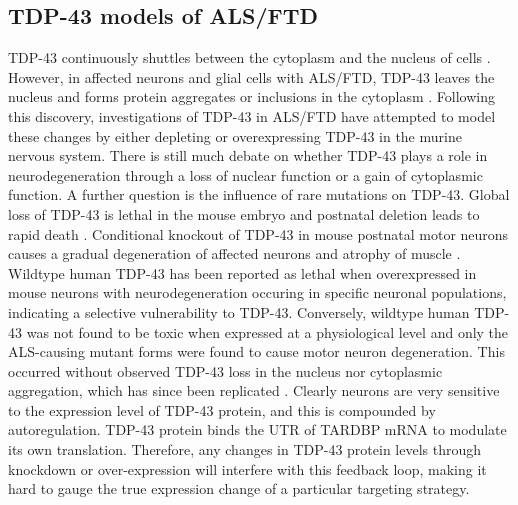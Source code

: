



\subsection{TDP-43 models of ALS/FTD}

TDP-43 continuously shuttles between the cytoplasm and the nucleus of cells \citep{Ayala2008}. However, in affected neurons and glial cells with ALS/FTD, TDP-43 leaves the nucleus and forms protein aggregates or inclusions in the cytoplasm \citep{Neumann2006-re}. Following this discovery, investigations of TDP-43 in ALS/FTD have attempted to model these changes by either depleting or overexpressing TDP-43 in the murine nervous system. There is still much debate on whether TDP-43 plays a role in neurodegeneration through a loss of nuclear function or a gain of cytoplasmic function.  A further question is the influence of rare mutations on TDP-43.
Global loss of TDP-43 is lethal in the mouse embryo \citep{Kraemer2010} and postnatal deletion leads to rapid death \citep{Chiang2010}. Conditional knockout of TDP-43 in mouse postnatal motor neurons causes a gradual degeneration of affected neurons and atrophy of muscle \citep{Iguchi2013}. Wildtype human TDP-43 has been reported as lethal when overexpressed in mouse neurons \citep{Shan2010,Wegorzewska2009} with neurodegeneration occuring in specific neuronal populations, indicating a selective vulnerability to TDP-43. Conversely, wildtype human TDP-43 was not found to be toxic when expressed at a physiological level \citep{Arnold2013} and only the ALS-causing mutant forms were found to cause motor neuron degeneration. This occurred without observed TDP-43 loss in the nucleus nor cytoplasmic aggregation, which has since been replicated \citep{Igaz2011}. Clearly neurons are very sensitive to the expression level of TDP-43 protein, and this is compounded by autoregulation. TDP-43 protein binds the UTR of TARDBP mRNA to modulate its own translation\citep{Ayala2011,Koyama2016}. Therefore, any changes in TDP-43 protein levels through knockdown or over-expression will interfere with this feedback loop, making it hard to gauge the true expression change of a particular targeting strategy. 

